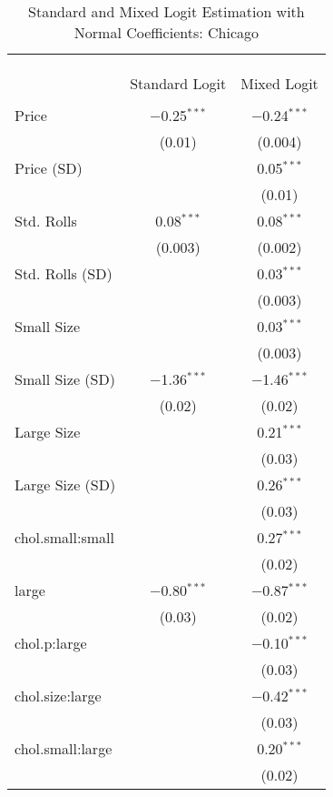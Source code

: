 
\begin{table}[!htbp] \centering 
  \caption{Standard and Mixed Logit Estimation with Normal Coefficients: Chicago} 
  \label{tab:mnlChicagoBaseline} 
\begin{tabular}{@{\extracolsep{5pt}}lcc} 
\\[-1.8ex]\hline 
\hline \\[-1.8ex] 
\\[-1.8ex] & \multicolumn{2}{c}{} \\ 
 & Standard Logit & Mixed Logit \\ 
\hline \\[-1.8ex] 
 Price & $-$0.25$^{***}$ & $-$0.24$^{***}$ \\ 
  & (0.01) & (0.004) \\ 
  Price (SD) &  & 0.05$^{***}$ \\ 
  &  & (0.01) \\ 
  Std. Rolls & 0.08$^{***}$ & 0.08$^{***}$ \\ 
  & (0.003) & (0.002) \\ 
  Std. Rolls (SD) &  & 0.03$^{***}$ \\ 
  &  & (0.003) \\ 
  Small Size &  & 0.03$^{***}$ \\ 
  &  & (0.003) \\ 
  Small Size (SD) & $-$1.36$^{***}$ & $-$1.46$^{***}$ \\ 
  & (0.02) & (0.02) \\ 
  Large Size &  & 0.21$^{***}$ \\ 
  &  & (0.03) \\ 
  Large Size (SD) &  & 0.26$^{***}$ \\ 
  &  & (0.03) \\ 
  chol.small:small &  & 0.27$^{***}$ \\ 
  &  & (0.02) \\ 
  large & $-$0.80$^{***}$ & $-$0.87$^{***}$ \\ 
  & (0.03) & (0.02) \\ 
  chol.p:large &  & $-$0.10$^{***}$ \\ 
  &  & (0.03) \\ 
  chol.size:large &  & $-$0.42$^{***}$ \\ 
  &  & (0.03) \\ 
  chol.small:large &  & 0.20$^{***}$ \\ 
  &  & (0.02) \\ 

\end{tabular}
\end{table}
